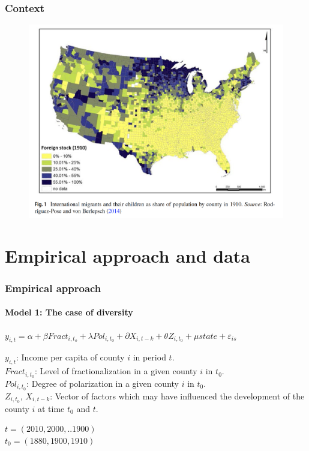 \documentclass[pdftex,12pt,xcolor=pdftex,table]{beamer}
\begin{document}
\begin{frame}
\frametitle{Context}

\begin{figure}
	\begin{center}
	\includegraphics[scale=0.3]{context1.png} 
	\end{center}
\end{figure}

\end{frame}


\section{Empirical approach and data}

\begin{frame}
\frametitle{Empirical approach}
\framesubtitle{Model 1: The case of diversity}

$y_{i,t}=\alpha+\beta Fract_{i,t_{o}}+\lambda Pol_{i,t_{0}}+\partial X_{i,t-k}+\theta Z_{i,t_{0}}+\mu state+\varepsilon_{is}$

\medskip{}

\small{
$y_{i,t}$: Income per capita of county $i$ in period $t$. \\
$Fract_{i, t_{0}}$: Level of fractionalization in a given county $i$ in $t_{0}$. \\
$Pol_{i,t_{0}}$: Degree of polarization in a given county $i$ in $t_{0}$. \\
$Z_{i,t_{0}}$, $X_{i,t-k}$: Vector of factors which may have influenced the development of the county $i$ at time $t_{0}$ and $t$.

\medskip{}

$t=(2010, 2000,..1900)$ \\
$t_{0}=(1880, 1900, 1910)$
}


\end{frame}
\end{document}
